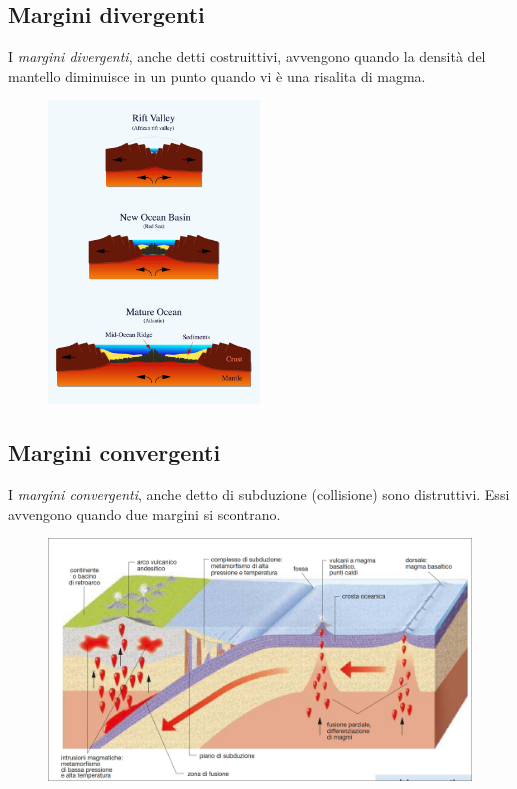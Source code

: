 \documentclass[a4paper]{article}
\begin{document}

\subsection{Margini divergenti}

I \textit{margini divergenti}, anche detti costruittivi, avvengono quando
la densità del mantello diminuisce in un punto quando vi è una risalita di magma.

\begin{figure}[h]
    \centering
    \includegraphics[width=0.5\textwidth]{rift-valley.jpg}
\end{figure}

\pagebreak

\subsection{Margini convergenti}

I \textit{margini convergenti}, anche detto di subduzione (collisione) sono distruttivi.
Essi avvengono quando due margini si scontrano.

\begin{figure}[h]
    \centering
    \includegraphics[width=\textwidth]{mconvergenti.png}
\end{figure}
\end{document}
